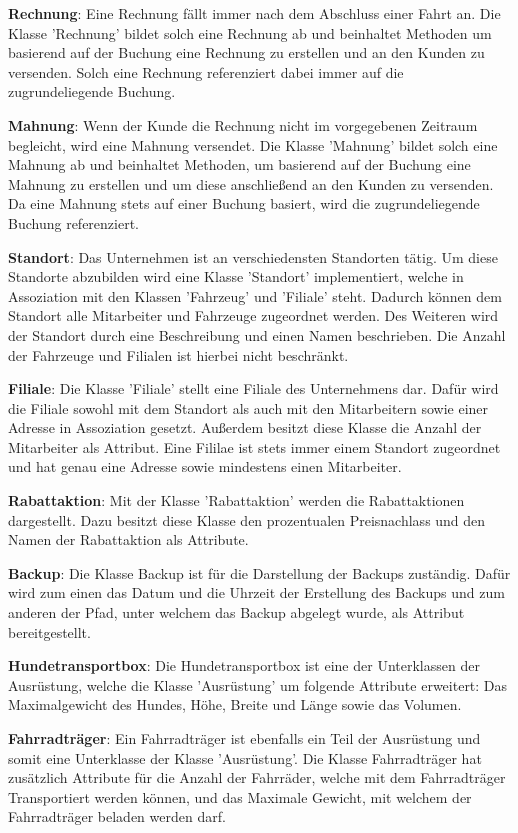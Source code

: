 \textbf{Rechnung}: Eine Rechnung fällt immer nach dem Abschluss einer Fahrt an. Die Klasse 'Rechnung' bildet solch eine Rechnung ab und beinhaltet Methoden um basierend auf der Buchung eine Rechnung zu erstellen und an den Kunden zu versenden. Solch eine Rechnung referenziert dabei immer auf die zugrundeliegende Buchung.

\textbf{Mahnung}: Wenn der Kunde die Rechnung nicht im vorgegebenen Zeitraum begleicht, wird eine Mahnung versendet. Die Klasse 'Mahnung' bildet solch eine Mahnung ab und beinhaltet Methoden, um basierend auf der Buchung eine Mahnung zu erstellen und um diese anschließend an den Kunden zu versenden. Da eine Mahnung stets auf einer Buchung basiert, wird die zugrundeliegende Buchung referenziert.

\textbf{Standort}: Das Unternehmen ist an verschiedensten Standorten tätig. Um diese Standorte abzubilden wird eine Klasse 'Standort' implementiert, welche in Assoziation mit den Klassen 'Fahrzeug' und 'Filiale' steht. Dadurch können dem Standort alle Mitarbeiter und Fahrzeuge zugeordnet werden.
Des Weiteren wird der Standort durch eine Beschreibung und einen Namen beschrieben. Die Anzahl der Fahrzeuge und Filialen ist hierbei nicht beschränkt.

\textbf{Filiale}: Die Klasse 'Filiale' stellt eine Filiale des Unternehmens dar. Dafür wird die Filiale sowohl mit dem Standort als auch mit den Mitarbeitern sowie einer Adresse in Assoziation gesetzt. Außerdem besitzt diese Klasse die Anzahl der Mitarbeiter als Attribut. Eine Fililae ist stets immer einem Standort zugeordnet und hat genau eine Adresse sowie mindestens einen Mitarbeiter. 

\textbf{Rabattaktion}: Mit der Klasse 'Rabattaktion' werden die Rabattaktionen dargestellt. Dazu besitzt diese Klasse den prozentualen Preisnachlass und den Namen der Rabattaktion als Attribute.

\textbf{Backup}: Die Klasse Backup ist für die Darstellung der Backups zuständig. Dafür wird zum einen das Datum und die Uhrzeit der Erstellung des Backups und zum anderen der Pfad, unter welchem das Backup abgelegt wurde, als Attribut bereitgestellt.

\textbf{Hundetransportbox}: Die Hundetransportbox ist eine der Unterklassen der Ausrüstung, welche die Klasse 'Ausrüstung' um folgende Attribute erweitert: Das Maximalgewicht des Hundes, Höhe, Breite und Länge sowie das Volumen.

\textbf{Fahrradträger}: Ein Fahrradträger ist ebenfalls ein Teil der Ausrüstung und somit eine Unterklasse der Klasse 'Ausrüstung'. Die Klasse Fahrradträger hat zusätzlich Attribute für die Anzahl der Fahrräder, welche mit dem Fahrradträger Transportiert werden können, und das Maximale Gewicht, mit welchem der Fahrradträger beladen werden darf.

